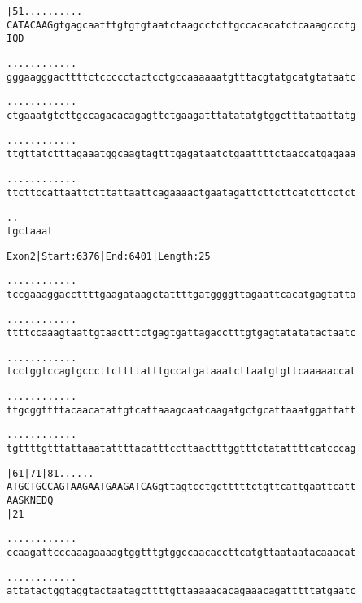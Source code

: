 \documentclass{article}
\begin{document}
\begin{alltt}
   |51      .    .    .    .    .    .    .    .    .    .
CATACAAGgtgagcaatttgtgtgtaatctaagcctcttgccacacatctcaaagccctg
 I  Q  D


  .    .    .    .    .    .    .    .    .    .    .    .
gggaagggacttttctccccctactcctgccaaaaaatgtttacgtatgcatgtataatc



  .    .    .    .    .    .    .    .    .    .    .    .
ctgaaatgtcttgccagacacagagttctgaagatttatatatgtggctttataattatg



  .    .    .    .    .    .    .    .    .    .    .    .
ttgttatctttagaaatggcaagtagtttgagataatctgaattttctaaccatgagaaa



  .    .    .    .    .    .    .    .    .    .    .    .
ttcttccattaattctttattaattcagaaaactgaatagattcttcttcatcttcctct



  .    .
tgctaaat


\end{alltt}
\newpage
\begin{alltt}
Exon 2 | Start: 6376 | End: 6401 | Length: 25

.    .    .    .    .    .    .    .    .    .    .    .
tccgaaaggaccttttgaagataagctattttgatggggttagaattcacatgagtatta



.    .    .    .    .    .    .    .    .    .    .    .
ttttccaaagtaattgtaactttctgagtgattagacctttgtgagtatatatactaatc



.    .    .    .    .    .    .    .    .    .    .    .
tcctggtccagtgcccttcttttatttgccatgataaatcttaatgtgttcaaaaaccat



.    .    .    .    .    .    .    .    .    .    .    .
ttgcggttttacaacatattgtcattaaagcaatcaagatgctgcattaaatggattatt



.    .    .    .    .    .    .    .    .    .    .    .
tgttttgtttattaaatattttacatttccttaactttggtttctatattttcatcccag



     |61       |71       |81  .    .    .    .    .    .
ATGCTGCCAGTAAGAATGAAGATCAGgttagtcctgctttttctgttcattgaattcatt
  A  A  S  K  N  E  D  Q
     |21

.    .    .    .    .    .    .    .    .    .    .    .
ccaagattcccaaagaaaagtggtttgtggccaacaccttcatgttaataatacaaacat



.    .    .    .    .    .    .    .    .    .    .    .
attatactggtaggtactaatagcttttgttaaaaacacagaaacagatttttatgaatc



\end{alltt}
\end{document}

